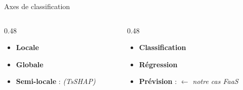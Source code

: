 \documentclass[10pt]{beamer}
\begin{document}
\begin{frame}{Axes de classification}
	\begin{columns}
		\begin{column}{0.48\textwidth}
			\begin{tcolorbox}[
				colback=orange!3,
				colframe=orange!50!black,
				arc=2mm,
				boxrule=0.5pt,
				fonttitle=\bfseries,
				title={Axe 3 --- Quelle portée ?}
				]
				\begin{itemize}
					\item \textbf{Locale}
					\item \textbf{Globale}
					\item \textbf{Semi-locale} : \textit{(TsSHAP)}
				\end{itemize}
			\end{tcolorbox}
		\end{column}
		\begin{column}{0.48\textwidth}
			\begin{tcolorbox}[
				colback=purple!3,
				colframe=purple!50!black,
				arc=2mm,
				boxrule=0.5pt,
				fonttitle=\bfseries,
				title={Axe 4 --- Quelle tâche ?}
				]
				\begin{itemize}
					\item \textbf{Classification}
					\item \textbf{Régression}
					\item \textbf{Prévision} : \textit{$\leftarrow$ notre cas FaaS}
				\end{itemize}
			\end{tcolorbox}
		\end{column}
	\end{columns}
\end{frame}
\end{document}
